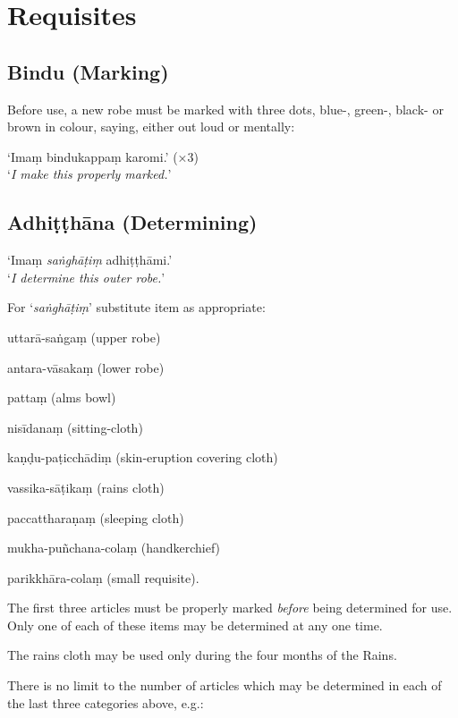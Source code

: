 \chapter{Requisites}

\section{Bindu (Marking)}

Before use, a new robe must be marked with three dots, blue-, green-, black- or
brown in colour, saying, either out loud or mentally:

‘Imaṃ bindukappaṃ karomi.’ (×3)\\
‘\emph{I make this properly marked.}’ 

\section{Adhiṭṭhāna (Determining)}

‘Imaṃ \emph{saṅghāṭiṃ} adhiṭṭhāmi.’\\
‘\emph{I determine this outer robe.}’

For ‘\emph{saṅghāṭiṃ}’ substitute item as appropriate:

\begin{packeditemize}

\item uttarā-saṅgaṃ (upper robe)
\item antara-vāsakaṃ (lower robe)
\item pattaṃ (alms bowl)
\item nisīdanaṃ (sitting-cloth)
\item kaṇḍu-paṭicchādiṃ (skin-eruption covering cloth)
\item vassika-sāṭikaṃ (rains cloth)
\item paccattharaṇaṃ (sleeping cloth)
\item mukha-puñchana-colaṃ (handkerchief)
\item parikkhāra-colaṃ (small requisite).

\end{packeditemize}

The first three articles must be properly marked \emph{before} being determined
for use. Only one of each of these items may be determined at any one time.

The rains cloth may be used only during the four months of the Rains.

There is no limit to the number of articles which may be determined in each of
the last three categories above, e.g.:

